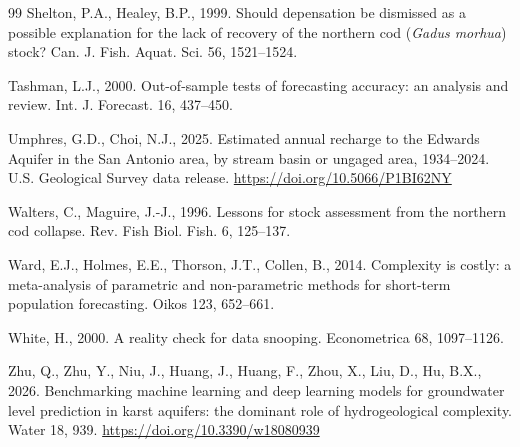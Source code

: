 \begin{thebibliography}{99}
Shelton, P.A., Healey, B.P., 1999. Should depensation be dismissed as a possible explanation for the lack of recovery of the northern cod (\emph{Gadus morhua}) stock? Can. J. Fish. Aquat. Sci. 56, 1521--1524.

Tashman, L.J., 2000. Out-of-sample tests of forecasting accuracy: an analysis and review. Int. J. Forecast. 16, 437--450.

Umphres, G.D., Choi, N.J., 2025. Estimated annual recharge to the Edwards Aquifer in the San Antonio area, by stream basin or ungaged area, 1934--2024. U.S. Geological Survey data release. \url{https://doi.org/10.5066/P1BI62NY}

Walters, C., Maguire, J.-J., 1996. Lessons for stock assessment from the northern cod collapse. Rev. Fish Biol. Fish. 6, 125--137.

Ward, E.J., Holmes, E.E., Thorson, J.T., Collen, B., 2014. Complexity is costly: a meta-analysis of parametric and non-parametric methods for short-term population forecasting. Oikos 123, 652--661.

White, H., 2000. A reality check for data snooping. Econometrica 68, 1097--1126.

Zhu, Q., Zhu, Y., Niu, J., Huang, J., Huang, F., Zhou, X., Liu, D., Hu, B.X., 2026. Benchmarking machine learning and deep learning models for groundwater level prediction in karst aquifers: the dominant role of hydrogeological complexity. Water 18, 939. \url{https://doi.org/10.3390/w18080939}

\end{thebibliography}


